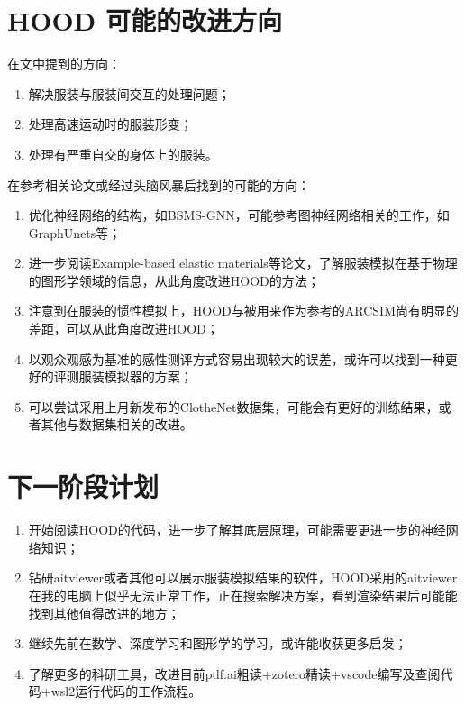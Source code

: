 \documentclass[a4paper, notitlepage, twocolumn]{article}
\begin{document}
\section{HOOD 可能的改进方向}
\par
在文中提到的方向：
\begin{enumerate}
    \item 解决服装与服装间交互的处理问题；
    \item 处理高速运动时的服装形变；
    \item 处理有严重自交的身体上的服装。
\end{enumerate}
\par
在参考相关论文或经过头脑风暴后找到的可能的方向：
\begin{enumerate}
    \item 优化神经网络的结构，如BSMS-GNN，可能参考图神经网络相关的工作，如GraphUnets等；
    \item 进一步阅读Example-based elastic materials等论文，了解服装模拟在基于物理的图形学领域的信息，从此角度改进HOOD的方法；
    \item 注意到在服装的惯性模拟上，HOOD与被用来作为参考的ARCSIM尚有明显的差距，可以从此角度改进HOOD；
    \item 以观众观感为基准的感性测评方式容易出现较大的误差，或许可以找到一种更好的评测服装模拟器的方案；
    \item 可以尝试采用上月新发布的ClotheNet数据集，可能会有更好的训练结果，或者其他与数据集相关的改进。
\end{enumerate}
\section{下一阶段计划}
\begin{enumerate}
    \item 开始阅读HOOD的代码，进一步了解其底层原理，可能需要更进一步的神经网络知识；
    \item 钻研aitviewer或者其他可以展示服装模拟结果的软件，HOOD采用的aitviewer在我的电脑上似乎无法正常工作，正在搜索解决方案，看到渲染结果后可能能找到其他值得改进的地方；
    \item 继续先前在数学、深度学习和图形学的学习，或许能收获更多启发；
    \item 了解更多的科研工具，改进目前pdf.ai粗读+zotero精读+vscode编写及查阅代码+wsl2运行代码的工作流程。
\end{enumerate}
\end{document}
